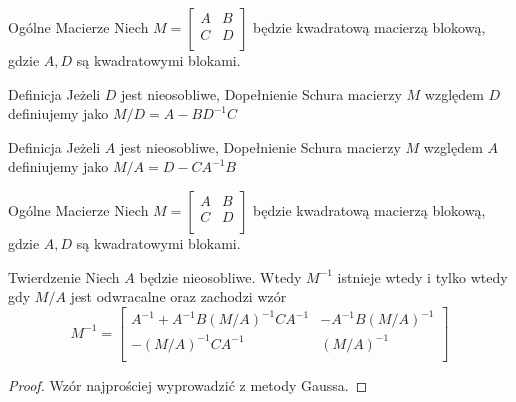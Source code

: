 \documentclass{beamer}
\begin{document}
\begin{frame}{Ogólne Macierze}
    Niech $M = \begin{bmatrix}
        A & B \\ C & D \\ 
    \end{bmatrix}$ będzie kwadratową macierzą blokową, gdzie $A,D$ są kwadratowymi blokami. 
    \begin{block}{Definicja}
        Jeżeli $D$ jest nieosobliwe, \alert{Dopełnienie Schura} macierzy $M$ względem $D$ definiujemy jako 
        $M/D = A -BD^{-1}C$
    \end{block}
    \begin{block}{Definicja}
        Jeżeli $A$ jest nieosobliwe, \alert{Dopełnienie Schura} macierzy $M$ względem $A$ definiujemy jako 
        $M/A = D -CA^{-1}B$
    \end{block}
\end{frame}

\begin{frame}{Ogólne Macierze}
    Niech $M = \begin{bmatrix}
        A & B \\ C & D \\ 
    \end{bmatrix}$ będzie kwadratową macierzą blokową, gdzie $A,D$ są kwadratowymi blokami.
    \begin{block}{Twierdzenie}
        Niech $A$ będzie nieosobliwe. Wtedy $M^{-1}$ istnieje wtedy i tylko wtedy gdy $M/A$ jest odwracalne 
        oraz zachodzi wzór
        $$ M^{-1}  = \begin{bmatrix}
            A^{-1} + A^{-1} B (M/A)^{-1} C A^{-1} & - A^{-1} B (M/A)^{-1} \\
            -(M/A)^{-1} C A^{-1} & (M/A)^{-1} \\  
        \end{bmatrix}$$
    \end{block}
    \begin{proof}
        Wzór najprościej wyprowadzić z metody Gaussa. 
    \end{proof}
\end{frame}
\end{document}
